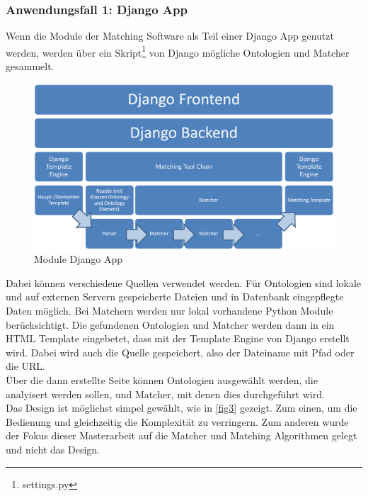 		\subsubsection{Anwendungsfall 1: Django App}
		Wenn die Module der Matching Software als Teil einer Django App genutzt
		werden, werden über ein Skript\footnote{settings.py} von Django
		mögliche Ontologien und Matcher gesammelt.
		
		\begin{figure}[ht]
		\centering
		\includegraphics[width=1.0\textwidth]{pics/Module-overview1.png}
		\caption{Module Django App}
		\label{fig6}
		\end{figure}
		Dabei können verschiedene Quellen verwendet werden. Für Ontologien sind lokale
		und auf externen Servern gespeicherte Dateien und in Datenbank
		eingepflegte Daten möglich. Bei Matchern werden nur lokal vorhandene Python
		Module berücksichtigt. Die gefundenen Ontologien und Matcher werden dann in
		ein HTML Template eingebetet, dass mit der Template Engine von Django erstellt
		wird. Dabei wird auch die Quelle gespeichert, also der Dateiname mit Pfad oder
		die URL.\\
		Über die dann erstellte Seite können Ontologien ausgewählt werden, die
		analyisert werden sollen, und Matcher, mit denen dies durchgeführt wird.\\
		Das Design ist möglichst simpel gewählt, wie in \ref{fig3} gezeigt. Zum einen,
		um die Bedienung und gleichzeitig die Komplexität zu verringern. Zum anderen wurde der Fokus dieser
		Masterarbeit auf die Matcher und Matching Algorithmen gelegt und nicht das
		Design.
		
